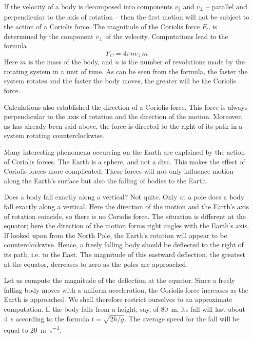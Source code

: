 If the velocity of a body is decomposed into components $v_{\parallel}$ and $v_{\perp}$ -- parallel and perpendicular to the axis of rotation -- then the first motion will not be subject
to the action of a Coriolis force. The magnitude of the
Coriolis force $F_{C}$ is determined by the component $v_{\perp}$
of the velocity. Computations lead to the formula
\begin{equation*}%
F_{C}= 4 \pi n v_{\perp} m
\end{equation*}
Here $m$ is the mass of the body, and $n$ is the number of
revolutions made by the rotating system in a unit of time. As can be seen from the formula, the faster the system rotates and the faster the body moves, the greater will be the Coriolis force.

Calculations also established the direction of a Coriolis force. This force is always perpendicular to the axis of rotation and the direction of the motion. Moreover, as has already been said above, the force is directed to the right of its path in a system rotating counterclockwise.

Many interesting phenomena occurring on the Earth
are explained by the action of Coriolis forces. The Earth
is a sphere, and not a disc. This makes the effect of
Coriolis forces more complicated. These forces will not
only influence motion along the Earth's surface but also
the falling of bodies to the Earth.

Does a body fall exactly along a vertical? Not quite.
Only at a pole does a body fall exactly along a vertical.
Here the direction of the motion and the Earth's axis of
rotation coincide, so there is no Coriolis force. The situation is different at the equator; here the direction of
the motion forms right angles with the Earth's axis.
If looked upon from the North Pole, the Earth's rotation
will appear to be counterclockwise. Hence, a freely falling
body should be deflected to the right of its path, i.e.
to the East. The magnitude of this eastward deflection,
the greatest at the equator, decreases to zero as the poles
are approached.

Let us compute the magnitude of the deflection at the
equator. Since a freely falling body moves with a uniform
acceleration, the Coriolis force increases as the Earth
is approached. We shall therefore restrict ourselves to
an approximate computation. If the body falls from a
height, say, of \SI{80}{\meter}, its fall will last about \SI{4}{\second} according to the formula $t = \sqrt{2h/g}$. The average speed for the fall will be equal to \SI{20}{\meter\per\second}.

